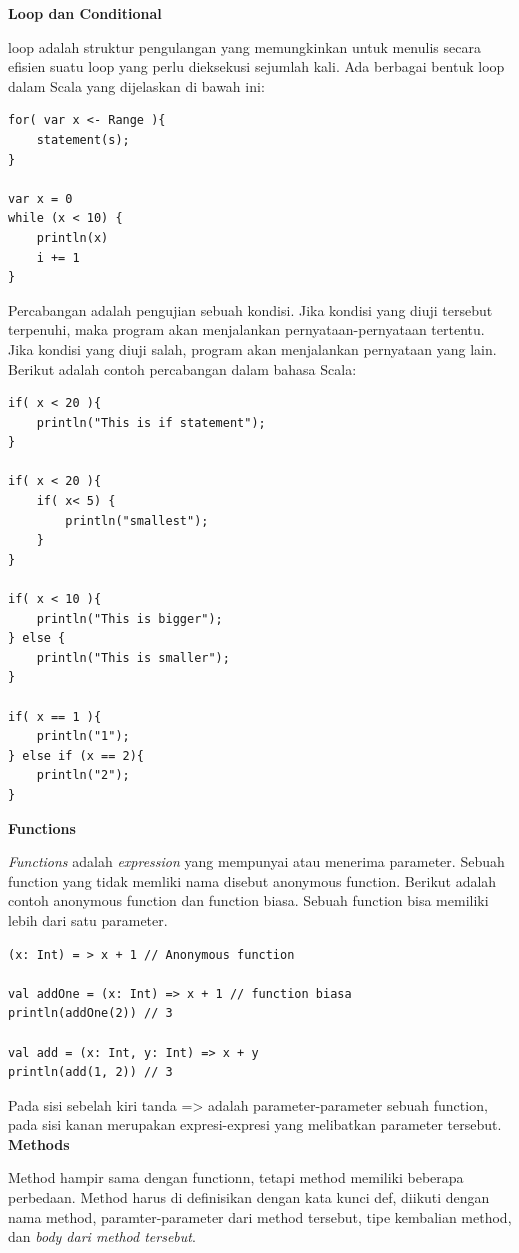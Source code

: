 \documentclass[a4paper,twoside]{article}
\begin{document}
\begin{enumerate}
\textbf{Loop dan Conditional}

loop adalah struktur pengulangan yang memungkinkan untuk menulis secara efisien suatu loop yang perlu dieksekusi sejumlah kali. Ada berbagai bentuk loop dalam Scala yang dijelaskan di bawah ini: 

\begin{verbatim}
for( var x <- Range ){
    statement(s);
}

var x = 0
while (x < 10) {
    println(x)
    i += 1
}
\end{verbatim}

Percabangan adalah pengujian sebuah kondisi. Jika kondisi yang diuji tersebut terpenuhi, maka program akan menjalankan pernyataan-pernyataan tertentu. Jika kondisi yang diuji salah, program akan menjalankan pernyataan yang lain. Berikut adalah contoh percabangan dalam bahasa Scala:

\begin{verbatim}
if( x < 20 ){
    println("This is if statement");
}

if( x < 20 ){
    if( x< 5) {
        println("smallest");
    }
}

if( x < 10 ){
    println("This is bigger");
} else { 
    println("This is smaller");
}

if( x == 1 ){
    println("1");
} else if (x == 2){ 
    println("2");
}
\end{verbatim}


\textbf{Functions}

\textit{Functions} adalah \textit{expression} yang mempunyai atau menerima parameter. Sebuah function yang tidak memliki nama disebut anonymous function. Berikut adalah contoh anonymous function dan function biasa. Sebuah function bisa memiliki lebih dari satu parameter.

\begin{verbatim}
(x: Int) = > x + 1 // Anonymous function 

val addOne = (x: Int) => x + 1 // function biasa 
println(addOne(2)) // 3 

val add = (x: Int, y: Int) => x + y 
println(add(1, 2)) // 3 
\end{verbatim}

Pada sisi sebelah kiri tanda => adalah parameter-parameter sebuah function, pada sisi kanan merupakan expresi-expresi yang melibatkan parameter tersebut. \\


\textbf{Methods}

Method hampir sama dengan functionn, tetapi method memiliki beberapa perbedaan. Method harus di definisikan dengan kata kunci def, diikuti dengan nama method, paramter-parameter dari method tersebut, tipe kembalian method, dan \textit{body dari method tersebut}. 


\end{enumerate}
\end{document}
